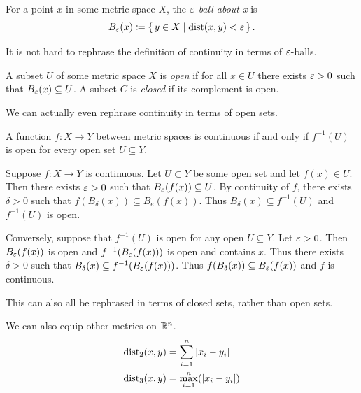 \documentclass[letterpaper, 11pt, oneside]{book}
\begin{document}
\begin{defn}[$\e$-ball]
  For a point $x$ in some metric space $X$, the \emph{$\e$-ball about x} is
  \[
    B_{\varepsilon}(x) \coloneqq \set{y \in X | \operatorname{dist}(x, y) < \varepsilon}.
  \]
\end{defn}

It is not hard to rephrase the definition of continuity in terms of $\e$-balls.

\begin{defn}
  A subset $U$ of some metric space $X$ is \emph{open} if for all $x \in U$ there exists $\varepsilon > 0$ such that $B_{\varepsilon}(x) \subseteq U$.
  A subset $C$ is \emph{closed} if its complement is open.
\end{defn}

We can actually even rephrase continuity in terms of open sets.

\clearpage

\begin{prop}
  A function $f\colon X \to Y$ between metric spaces is continuous if and only if $f^{-1}(U)$ is open for every open set $U \subseteq Y$.
\end{prop}
\begin{pf}
  Suppose $f\colon X \to Y$ is continuous.
  Let $U \subset Y$ be some open set and let $f(x) \in U$.
  Then there exists $\varepsilon > 0$ such that $B_{\varepsilon}(f(x)) \subseteq U$.
  By continuity of $f$, there exists $\delta > 0$ such that $f(B_{\delta}(x)) \subseteq B_{e}(f(x))$.
  Thus $B_{\delta}(x) \subseteq f^{-1}(U)$ and $f^{-1}(U)$ is open.

  Conversely, suppose that $f^{-1}(U)$ is open for any open $U \subseteq Y$.
  Let $\varepsilon > 0$.
  Then $B_{\varepsilon}(f(x))$ is open and $f^{-1}(B_{\varepsilon}(f(x)))$ is open and contains $x$.
  Thus there exists $\delta > 0$ such that $B_{\delta}(x) \subseteq f^{-1}(B_{\varepsilon}(f(x)))$.
  Thus $f(B_{\delta}(x)) \subseteq B_{\varepsilon}(f(x))$ and $f$ is continuous.
\end{pf}

This can also all be rephrased in terms of closed sets, rather than open sets.

\begin{ex}
  We can also equip other metrics on $\mathbb{R}^{n}$.
  \begin{align*}
    \operatorname{dist}_{2}(x, y) &= \sum_{i = 1}^{n} \abs{x_{i} - y_{i}} \\
    \operatorname{dist}_{3}(x, y) &= \max_{i = 1}^{n} (\abs{x_{i} - y_{i}})
  \end{align*}
\end{ex}
\end{document}
